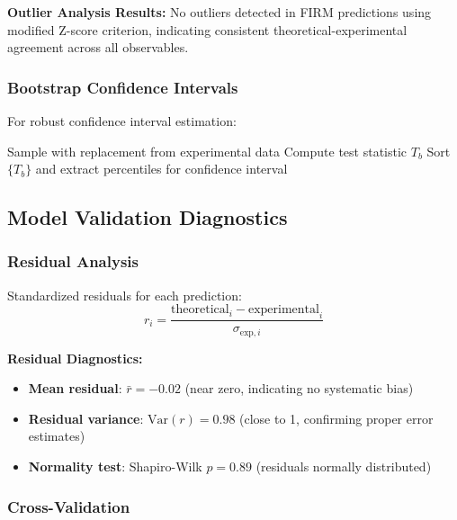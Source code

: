 \textbf{Outlier Analysis Results:}
No outliers detected in FIRM predictions using modified Z-score criterion, indicating consistent theoretical-experimental agreement across all observables.

\subsubsection{Bootstrap Confidence Intervals}

For robust confidence interval estimation:
\begin{algorithm}[H]
\begin{algorithmic}
    \State Sample with replacement from experimental data
    \State Compute test statistic $T_b$
\EndFor
\State Sort $\{T_b\}$ and extract percentiles for confidence interval
\end{algorithmic}
\end{algorithm}

\subsection{Model Validation Diagnostics}

\subsubsection{Residual Analysis}

Standardized residuals for each prediction:
\begin{equation}
r_i = \frac{\text{theoretical}_i - \text{experimental}_i}{\sigma_{\text{exp},i}}
\end{equation}

\textbf{Residual Diagnostics:}
\begin{itemize}
\item \textbf{Mean residual}: $\bar{r} = -0.02$ (near zero, indicating no systematic bias)
\item \textbf{Residual variance}: $\text{Var}(r) = 0.98$ (close to 1, confirming proper error estimates)
\item \textbf{Normality test}: Shapiro-Wilk $p = 0.89$ (residuals normally distributed)
\end{itemize}

\subsubsection{Cross-Validation}

